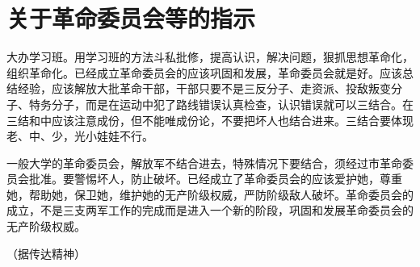 \section[关于革命委员会等的指示（一九六八年二月）]{关于革命委员会等的指示}


大办学习班。用学习班的方法斗私批修，提高认识，解决问题，狠抓思想革命化，组织革命化。已经成立革命委员会的应该巩固和发展，革命委员会就是好。应该总结经验，应该解放大批革命干部，干部只要不是三反分子、走资派、投敌叛变分子、特务分子，而是在运动中犯了路线错误认真检查，认识错误就可以三结合。在三结和中应该注意成份，但不能唯成份论，不要把坏人也结合进来。三结合要体现老、中、少，光小娃娃不行。

一般大学的革命委员会，解放军不结合进去，特殊情况下要结合，须经过市革命委员会批准。要警惕坏人，防止破坏。已经成立了革命委员会的应该爱护她，尊重她，帮助她，保卫她，维护她的无产阶级权威，严防阶级敌人破坏。革命委员会的成立，不是三支两军工作的完成而是进入一个新的阶段，巩固和发展革命委员会的无产阶级权威。

（据传达精神）


